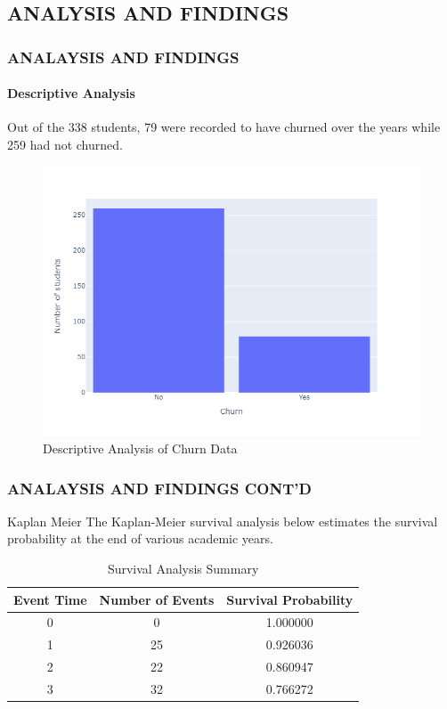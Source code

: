 \documentclass[12pt]{beamer}
\begin{document}
	\begin{frame}
  	\section{ANALYSIS AND FINDINGS}

    \frametitle{ANALAYSIS AND FINDINGS}
    \framesubtitle{Descriptive Analysis}
    \begin{block}{}
        Out of the 338 students, 79 were recorded to have churned over the years while 259 had not churned.
    \end{block}

\begin{figure}[H]
    \centering
    \includegraphics[width=0.68\linewidth, height=0.5\textheight]{Figure 4/distribution.png}
    \caption{Descriptive Analysis of Churn Data}
    \label{fig:enter-label}
\end{figure}


\end{frame}

 
\begin{frame}

    \frametitle{ANALAYSIS AND FINDINGS CONT'D}
    
    \begin{block}{Kaplan Meier}
        The Kaplan-Meier survival analysis below estimates the survival probability at the end of various academic years.
    \end{block}
    
    
   \begin{table}[H]
\centering
\begin{tabular}{ccc}
\hline
\textbf{Event Time} & \textbf{Number of Events} & \textbf{Survival Probability} \\
\hline
0& 0  & 1.000000 \\
1& 25 & 0.926036 \\
2& 22 & 0.860947 \\
3& 32 & 0.766272 \\ \hline
\end{tabular}
\caption{Survival Analysis Summary}
\label{Kaplan Meier Table}
\end{table}


\end{frame}
\end{document}
